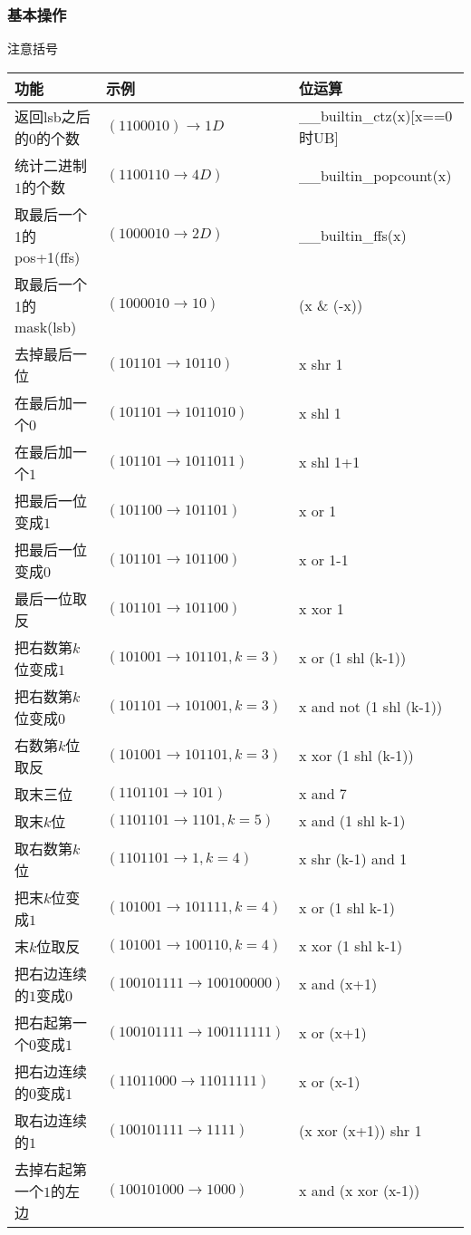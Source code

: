 	\subsubsection{基本操作}
	注意括号\\
		\begin{table}[htbp]
		\centering
		\begin{tabular}{l|l|l}
		\toprule
		功能 & 示例 & 位运算\\
		\midrule
		返回lsb之后的0的个数 & $(1100010)\rightarrow 1D$ & \_\_builtin\_ctz(x)[x==0时UB]\\
		统计二进制$1$的个数  & $(1100110\rightarrow 4D)$        &\_\_builtin\_popcount(x)\\
		取最后一个1的pos+1(ffs) & $(1000010\rightarrow 2D)$       &\_\_builtin\_ffs(x)\\
		取最后一个1的mask(lsb)   & $(1000010\rightarrow 10)$      & (x \& (-x))\\
		去掉最后一位		  & $(101101\rightarrow 10110)$		   & x shr 1\\
		在最后加一个$0$		 & $(101101\rightarrow1011010)$		 & x shl 1\\
		在最后加一个$1$		 & $(101101\rightarrow1011011)$		 & x shl 1+1\\
		把最后一位变成$1$	   & $(101100\rightarrow101101)$		  & x or 1\\
		把最后一位变成$0$	   & $(101101\rightarrow101100)$		  & x or 1-1\\
		最后一位取反		  & $(101101\rightarrow101100)$		  & x xor 1\\
		把右数第$k$位变成$1$	  & $(101001\rightarrow101101,k=3)$	  & x or (1 shl (k-1))\\
		把右数第$k$位变成$0$	  & $(101101\rightarrow101001,k=3)$	  & x and not (1 shl (k-1))\\
		右数第$k$位取反		 & $(101001\rightarrow101101,k=3)$	  & x xor (1 shl (k-1))\\
		取末三位			  & $(1101101\rightarrow101)$			& x and 7\\
		取末$k$位			   & $(1101101\rightarrow1101,k=5)$	   & x and (1 shl k-1)\\
		取右数第$k$位		   & $(1101101\rightarrow1,k=4)$		  & x shr (k-1) and 1\\
		把末$k$位变成$1$		  & $(101001\rightarrow101111,k=4)$	  & x or (1 shl k-1)\\
		末$k$位取反			 & $(101001\rightarrow100110,k=4)$	  & x xor (1 shl k-1)\\
		把右边连续的$1$变成$0$	& $(100101111\rightarrow100100000)$	& x and (x+1)\\
		把右起第一个$0$变成$1$	& $(100101111\rightarrow100111111)$	& x or (x+1)\\
		把右边连续的$0$变成$1$	& $(11011000\rightarrow11011111)$	  & x or (x-1)\\
		取右边连续的$1$		 & $(100101111\rightarrow1111)$		 & (x xor (x+1)) shr 1\\
		去掉右起第一个$1$的左边 & $(100101000\rightarrow1000)$		 & x and (x xor (x-1))\\
		\bottomrule
		\end{tabular}
	\end{table}
	
